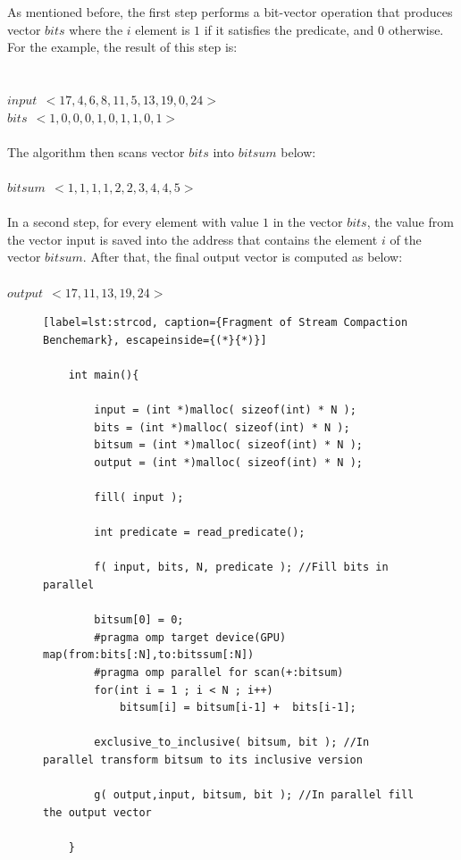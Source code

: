 \documentclass[Ingles]{ic-tese-v1}
\begin{document}
As mentioned before, the first step performs a bit-vector operation that produces vector $bits$ where
the $i$ element is $1$ if it satisfies the predicate, and $0$ otherwise. For the example, the result of this step is:\\\\\\
$input \:\: <17, 4, 6, 8, 11, 5, 13, 19, 0, 24>$\\
$bits \:\: <1, 0, 0, 0, 1, 0, 1, 1, 0, 1>$\\\\
The algorithm then scans vector $bits$ into $bitsum$ below:\\\\
$bitsum \:\: <1, 1, 1, 1, 2, 2, 3, 4, 4, 5> $\\\\
In a second step, for every element with value $1$ in the vector $bits$, the value from the vector input is saved into the address that contains the element $i$ of the vector $bitsum$. After that, the final output vector is computed as below:\\\\
$output \:\: <17, 11, 13, 19, 24>$\\
\begin{figure}[t]
	\lstset{basicstyle=\scriptsize}
	\begin{lstlisting}[label=lst:strcod, caption={Fragment of Stream Compaction Benchemark}, escapeinside={(*}{*)}]

	int main(){

		input = (int *)malloc( sizeof(int) * N );
		bits = (int *)malloc( sizeof(int) * N );
		bitsum = (int *)malloc( sizeof(int) * N );
		output = (int *)malloc( sizeof(int) * N );

		fill( input );

		int predicate = read_predicate();

		f( input, bits, N, predicate ); //Fill bits in parallel

		bitsum[0] = 0;
		#pragma omp target device(GPU) map(from:bits[:N],to:bitssum[:N])
		#pragma omp parallel for scan(+:bitsum)
		for(int i = 1 ; i < N ; i++)
			bitsum[i] = bitsum[i-1] +  bits[i-1];

		exclusive_to_inclusive( bitsum, bit ); //In parallel transform bitsum to its inclusive version

		g( output,input, bitsum, bit ); //In parallel fill the output vector

	}
	\end{lstlisting}
\end{figure}
\end{document}
